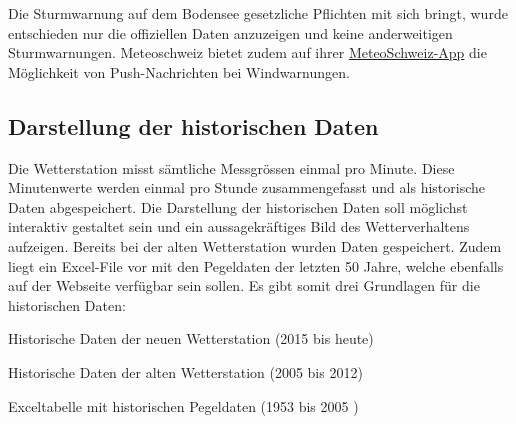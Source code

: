 \noindent
 Die Sturmwarnung auf dem Bodensee gesetzliche Pflichten mit sich bringt, wurde entschieden nur die offiziellen Daten anzuzeigen und keine anderweitigen Sturmwarnungen. Meteoschweiz bietet zudem auf ihrer  \href{https://www.meteoschweiz.admin.ch/home/service-und-publikationen/beratung-und-service/meteoschweiz-app.html}{MeteoSchweiz-App} die Möglichkeit von Push-Nachrichten bei Windwarnungen.







\subsection{Darstellung der historischen Daten}
Die Wetterstation misst sämtliche Messgrössen einmal pro Minute. Diese Minutenwerte werden einmal pro Stunde zusammengefasst und als historische Daten abgespeichert. Die Darstellung der historischen Daten soll möglichst interaktiv gestaltet sein und ein aussagekräftiges Bild des Wetterverhaltens aufzeigen. Bereits bei der alten Wetterstation wurden Daten gespeichert. Zudem liegt ein Excel-File vor mit den Pegeldaten der letzten 50 Jahre, welche ebenfalls auf der Webseite verfügbar sein sollen. Es gibt somit drei Grundlagen für die historischen Daten:

\begin{itemize*}
\item Historische Daten der neuen Wetterstation (2015 bis heute)
\item Historische Daten der alten Wetterstation (2005 bis 2012)
\item Exceltabelle mit historischen Pegeldaten (1953 bis 2005 )
\end{itemize*}

